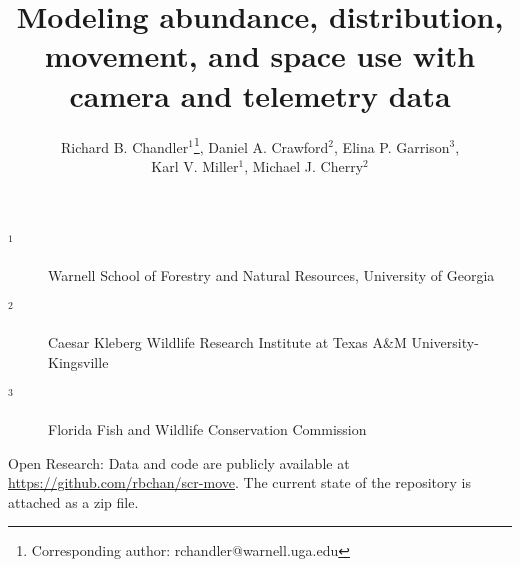\documentclass[12pt]{article}
\begin{document}
\title{Modeling abundance, distribution, movement, and space
  use with camera and telemetry data}
\author{Richard B. Chandler$^1$\footnote{Corresponding author: rchandler@warnell.uga.edu}, Daniel A. Crawford$^2$, Elina P. Garrison$^3$, \\
  Karl V. Miller$^1$, Michael J. Cherry$^2$}

\maketitle

\vspace{12pt}

\begin{description}%
\item[$^1$] Warnell School of Forestry and Natural Resources, University of Georgia %
\item[$^2$] Caesar Kleberg Wildlife Research Institute at Texas A\&M University-Kingsville %
\item[$^3$] Florida Fish and Wildlife Conservation Commission %
\end{description}


\vspace{24pt}

Open Research: Data and code are publicly available at
\url{https://github.com/rbchan/scr-move}. The current state of the
repository is attached as a zip file.  


\clearpage


\linenumbers
\doublespacing
\end{document}
